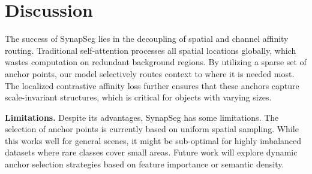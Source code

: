 \section{Discussion}
The success of SynapSeg lies in the decoupling of spatial and channel affinity routing. Traditional self-attention processes all spatial locations globally, which wastes computation on redundant background regions. By utilizing a sparse set of anchor points, our model selectively routes context to where it is needed most. The localized contrastive affinity loss further ensures that these anchors capture scale-invariant structures, which is critical for objects with varying sizes.

\textbf{Limitations.} Despite its advantages, SynapSeg has some limitations. The selection of anchor points is currently based on uniform spatial sampling. While this works well for general scenes, it might be sub-optimal for highly imbalanced datasets where rare classes cover small areas. Future work will explore dynamic anchor selection strategies based on feature importance or semantic density.
